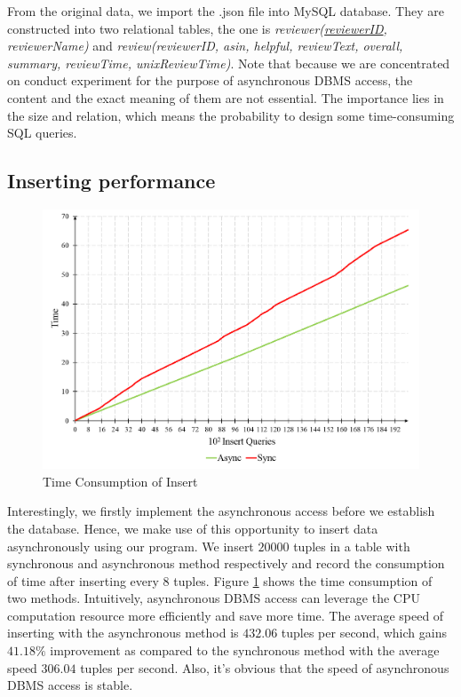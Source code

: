 \documentclass[onecolumn, conference, 12pt]{IEEEtran}
\begin{document}
	From the original data, we import the .json file into MySQL database. They are constructed into two relational tables, the one is \textit{reviewer(\underline{reviewerID}, reviewerName)} and \textit{review(reviewerID, asin, helpful, reviewText, overall, summary, reviewTime, unixReviewTime)}. Note that because we are concentrated on conduct experiment for the purpose of asynchronous DBMS access, the content and the exact meaning of them are not essential. The importance lies in the size and relation, which means the probability to design some time-consuming SQL queries.
	
	\subsection{Inserting performance}
	
	\begin{figure}[!t]
		\centering
		\includegraphics[width=6.5in]{fig/insert.png}
		\caption{Time Consumption of Insert}
		\label{fig_insert}
	\end{figure}
	Interestingly, we firstly implement the asynchronous access before we establish the database. Hence, we make use of this opportunity to insert data asynchronously using our program. We insert $ 20000 $ tuples in a table with synchronous and asynchronous method respectively and record the consumption of time after inserting every 8 tuples. Figure \ref{fig_insert} shows the time consumption of two methods. Intuitively, asynchronous DBMS access can leverage the CPU computation resource more efficiently and save more time. The average speed of inserting with the asynchronous method is $ 432.06 $ tuples per second, which gains $ 41.18\% $ improvement as compared to the synchronous method with the average speed $ 306.04 $ tuples per second. Also, it’s obvious that the speed of asynchronous DBMS access is stable.
	
\end{document}
